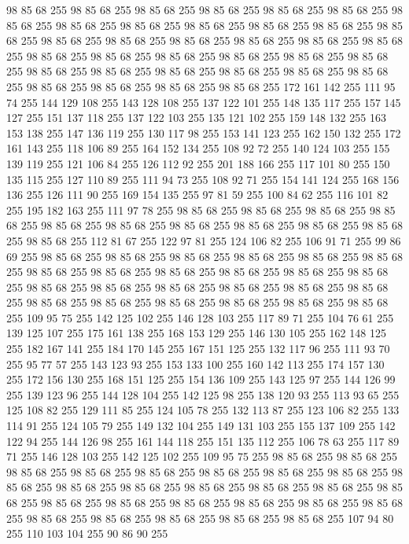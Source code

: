 98 85 68 255 98 85 68 255 98 85 68 255 98 85 68 255 98 85 68 255 98 85 68 255 98 85 68 255 98 85 68 255 98 85 68 255 98 85 68 255 98 85 68 255 98 85 68 255 98 85 68 255 98 85 68 255 98 85 68 255 98 85 68 255 98 85 68 255 98 85 68 255 98 85 68 255 98 85 68 255 98 85 68 255 98 85 68 255 98 85 68 255 98 85 68 255 98 85 68 255 98 85 68 255 98 85 68 255 98 85 68 255 98 85 68 255 98 85 68 255 98 85 68 255 98 85 68 255 98 85 68 255 98 85 68 255 98 85 68 255 172 161 142 255 111 95 74 255 144 129 108 255 143 128 108 255 137 122 101 255 148 135 117 255 157 145 127 255 151 137 118 255 137 122 103 255 135 121 102 255 159 148 132 255 163 153 138 255 147 136 119 255 130 117 98 255 153 141 123 255 162 150 132 255 172 161 143 255 118 106 89 255 164 152 134 255 108 92 72 255 140 124 103 255 155 139 119 255 121 106 84 255 126 112 92 255 201 188 166 255 117 101 80 255 150 135 115 255 127 110 89 255 111 94 73 255
108 92 71 255 154 141 124 255 168 156 136 255 126 111 90 255 169 154 135 255 97 81 59 255 100 84 62 255 116 101 82 255 195 182 163 255 111 97 78 255 98 85 68 255 98 85 68 255 98 85 68 255 98 85 68 255 98 85 68 255 98 85 68 255 98 85 68 255 98 85 68 255 98 85 68 255 98 85 68 255 98 85 68 255 112 81 67 255 122 97 81 255 124 106 82 255 106 91 71 255 99 86 69 255 98 85 68 255 98 85 68 255 98 85 68 255 98 85 68 255 98 85 68 255 98 85 68 255 98 85 68 255 98 85 68 255 98 85 68 255 98 85 68 255 98 85 68 255 98 85 68 255 98 85 68 255 98 85 68 255 98 85 68 255 98 85 68 255 98 85 68 255 98 85 68 255 98 85 68 255 98 85 68 255 98 85 68 255 98 85 68 255 98 85 68 255 98 85 68 255 109 95 75 255 142 125 102 255 146 128 103 255 117 89 71 255 104 76 61 255 139 125 107 255 175 161 138 255 168 153 129 255 146 130 105 255 162 148 125 255 182 167 141 255 184 170 145 255 167 151 125 255 132 117 96 255
111 93 70 255 95 77 57 255 143 123 93 255 153 133 100 255 160 142 113 255 174 157 130 255 172 156 130 255 168 151 125 255 154 136 109 255 143 125 97 255 144 126 99 255 139 123 96 255 144 128 104 255 142 125 98 255 138 120 93 255 113 93 65 255 125 108 82 255 129 111 85 255 124 105 78 255 132 113 87 255 123 106 82 255 133 114 91 255 124 105 79 255 149 132 104 255 149 131 103 255 155 137 109 255 142 122 94 255 144 126 98 255 161 144 118 255 151 135 112 255 106 78 63 255 117 89 71 255 146 128 103 255 142 125 102 255 109 95 75 255 98 85 68 255 98 85 68 255 98 85 68 255 98 85 68 255 98 85 68 255 98 85 68 255 98 85 68 255 98 85 68 255 98 85 68 255 98 85 68 255 98 85 68 255 98 85 68 255 98 85 68 255 98 85 68 255 98 85 68 255 98 85 68 255 98 85 68 255 98 85 68 255 98 85 68 255 98 85 68 255 98 85 68 255 98 85 68 255 98 85 68 255 98 85 68 255 98 85 68 255 98 85 68 255 107 94 80 255 110 103 104 255 90 86 90 255
